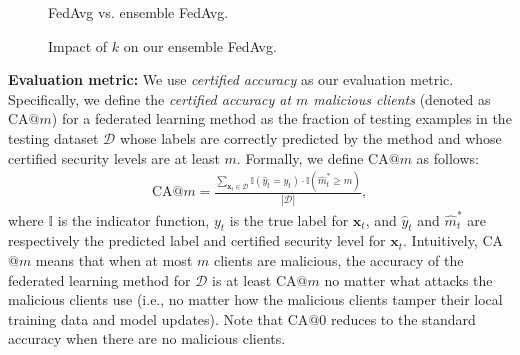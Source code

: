 \documentclass[letterpaper]{article} %
\begin{document}
\begin{figure}[!t]
\center
{}
\caption{FedAvg vs. ensemble FedAvg.}
\label{fig:q_compare}
\end{figure}

\begin{figure}[!t]
\center
{}
\caption{Impact of $k$ on our ensemble FedAvg.}
\label{fig:k}
\end{figure}


\noindent
{\bf Evaluation metric:}
We use  \emph{certified accuracy} as our evaluation metric.
Specifically, we define the \emph{certified accuracy at $m$ malicious clients} (denoted as CA$@m$) for a federated learning method as the fraction of testing examples in the testing dataset $\mathcal{D}$ whose labels are correctly predicted by the method and whose certified security levels are at least $m$. Formally, we define CA$@m$ as follows:
\begin{align}
\text{CA}@m=\frac{\sum_{\mathbf{x}_t \in \mathcal{D}} \mathbb{I}(\hat{y}_t=y_t)\cdot \mathbb{I}(\hat{m}_{t}^{*}\geq m)}{|\mathcal{D}|},
\end{align}
where $\mathbb{I}$ is the indicator function, $y_t$ is the true label for $\mathbf{x}_t$, and $\hat{y}_t$ and $\hat{m}_{t}^{*}$ are respectively the predicted label and  certified security level for $\mathbf{x}_t$. Intuitively, CA$@m$ means that when at most $m$ clients are malicious, the accuracy of the federated learning method for $\mathcal{D}$ is at least CA$@m$ no matter what attacks the malicious clients use (i.e., no matter how the malicious clients tamper their local training data and model updates). Note that CA$@0$ reduces to the standard accuracy when there are no malicious clients.
\end{document}
